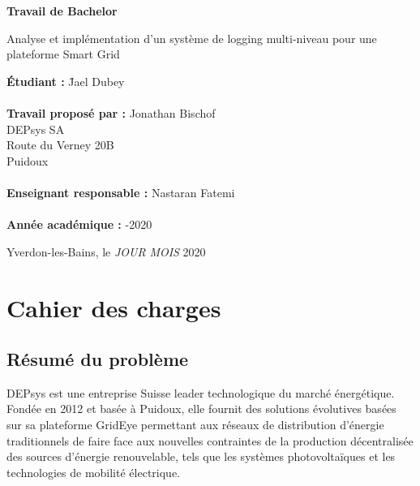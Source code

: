 \documentclass[paper=a4, fontsize=11pt]{scrartcl}
\begin{document}

\begin{titlepage}
  \thispagestyle{firstpage}
  \begin{center}
    \vspace*{5cm}
    
    \Huge
    \textbf{Travail de Bachelor}

    \vspace{1.5cm}
    \LARGE
    Analyse et implémentation d'un système de logging multi-niveau pour une plateforme Smart Grid
  \end{center}

  \vspace{6cm}
  \begin{tabbing}
    \linespread{3}\textbf{Étudiant :} \hspace{12em} \= Jael Dubey\\\\

    \textbf{Travail proposé par :} \> Jonathan Bischof\\
    \> DEPsys SA\\
    \> Route du Verney 20B\\
     Puidoux\\\\

    \textbf{Enseignant responsable :} \> Nastaran Fatemi\\\\

    \textbf{Année académique :} -2020
  \end{tabbing}

  \vspace{3cm}
  \begin{flushright}
    Yverdon-les-Bains, le \textit{JOUR} \textit{MOIS} 2020
  \end{flushright}
\end{titlepage}

\newpage

\section{Cahier des charges}
\subsection{Résumé du problème}
DEPsys est une entreprise Suisse leader technologique du marché énergétique. Fondée en 2012 et basée à Puidoux, elle fournit des solutions évolutives basées sur sa plateforme GridEye permettant aux réseaux de distribution d'énergie traditionnels de faire face aux nouvelles contraintes de la production décentralisée des sources d'énergie renouvelable, tels que les systèmes photovoltaïques et les technologies de mobilité électrique.
\end{document}
